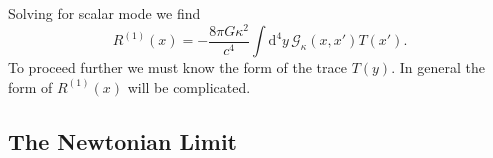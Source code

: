 \documentclass[a4paper, 11pt, titlepage, twoside]{report}
\newcommand{\dd}{\ensuremath{\mathrm{d}}}
\begin{document}
Solving for scalar mode we find
\begin{equation}
R^{(1)}(x) = -\frac{8 \pi G \kappa^2}{c^4}\int \dd^4 y\, \mathscr{G}_\kappa(x, x') T(x').
\end{equation}
To proceed further we must know the form of the trace $T(y)$. In general the form of $R^{(1)}(x)$ will be complicated.


\subsection{The Newtonian Limit}
\end{document}
